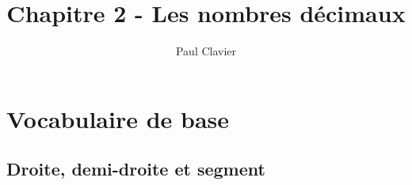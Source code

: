 \documentclass[12pt,a4paper]{article}
\author{Paul Clavier}
\title{Chapitre 2 - Les nombres décimaux}
\begin{document}
\renewcommand\thesection{\Roman{section}}
\renewcommand\thesubsection{\arabic{subsection}}

\TeacherModeOn

\ifdefined\isprof
	\TeacherModeOn
\fi




\begin{center}
\end{center}

\section{Vocabulaire de base}
\subsection{Droite, demi-droite et segment}
\end{document}
